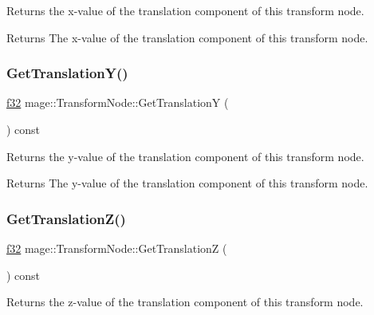 Returns the x-\/value of the translation component of this transform node.

\begin{DoxyReturn}{Returns}
The x-\/value of the translation component of this transform node. 
\end{DoxyReturn}
\hypertarget{structmage_1_1_transform_node_a637db0813401911ca6f0918a8219b666}{}\label{structmage_1_1_transform_node_a637db0813401911ca6f0918a8219b666} 
\subsubsection{\texorpdfstring{Get\+Translation\+Y()}{GetTranslationY()}}
{\footnotesize\ttfamily \hyperlink{namespacemage_a6a44ad388483959dc4dff9f2aef91431}{f32} mage\+::\+Transform\+Node\+::\+Get\+TranslationY (\begin{DoxyParamCaption}{ }\end{DoxyParamCaption}) const\hspace{0.3cm}{\ttfamily [noexcept]}}

Returns the y-\/value of the translation component of this transform node.

\begin{DoxyReturn}{Returns}
The y-\/value of the translation component of this transform node. 
\end{DoxyReturn}
\hypertarget{structmage_1_1_transform_node_a4975ec866f709857f6aa980c956ec627}{}\label{structmage_1_1_transform_node_a4975ec866f709857f6aa980c956ec627} 
\subsubsection{\texorpdfstring{Get\+Translation\+Z()}{GetTranslationZ()}}
{\footnotesize\ttfamily \hyperlink{namespacemage_a6a44ad388483959dc4dff9f2aef91431}{f32} mage\+::\+Transform\+Node\+::\+Get\+TranslationZ (\begin{DoxyParamCaption}{ }\end{DoxyParamCaption}) const\hspace{0.3cm}{\ttfamily [noexcept]}}

Returns the z-\/value of the translation component of this transform node.

